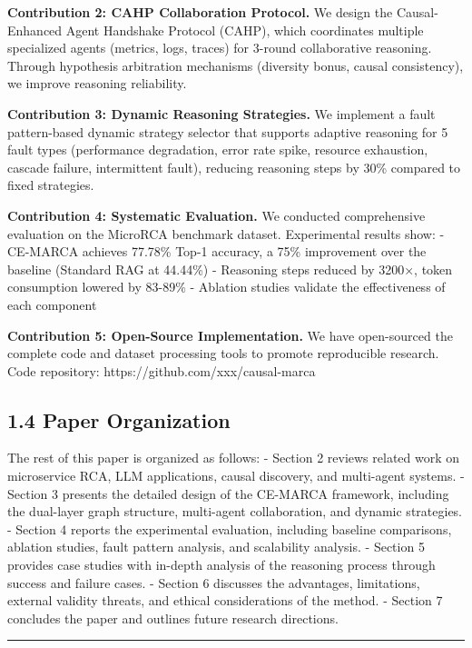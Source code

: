 \textbf{Contribution 2: CAHP Collaboration Protocol.} We design the
Causal-Enhanced Agent Handshake Protocol (CAHP), which coordinates
multiple specialized agents (metrics, logs, traces) for 3-round
collaborative reasoning. Through hypothesis arbitration mechanisms
(diversity bonus, causal consistency), we improve reasoning reliability.

\textbf{Contribution 3: Dynamic Reasoning Strategies.} We implement a
fault pattern-based dynamic strategy selector that supports adaptive
reasoning for 5 fault types (performance degradation, error rate spike,
resource exhaustion, cascade failure, intermittent fault), reducing
reasoning steps by 30\% compared to fixed strategies.

\textbf{Contribution 4: Systematic Evaluation.} We conducted
comprehensive evaluation on the MicroRCA benchmark dataset. Experimental
results show: - CE-MARCA achieves 77.78\% Top-1 accuracy, a 75\%
improvement over the baseline (Standard RAG at 44.44\%) - Reasoning
steps reduced by 3200×, token consumption lowered by 83-89\% - Ablation
studies validate the effectiveness of each component

\textbf{Contribution 5: Open-Source Implementation.} We have
open-sourced the complete code and dataset processing tools to promote
reproducible research. Code repository:
https://github.com/xxx/causal-marca

\hypertarget{paper-organization}{%
\subsection{1.4 Paper Organization}\label{paper-organization}}

The rest of this paper is organized as follows: - Section 2 reviews
related work on microservice RCA, LLM applications, causal discovery,
and multi-agent systems. - Section 3 presents the detailed design of the
CE-MARCA framework, including the dual-layer graph structure,
multi-agent collaboration, and dynamic strategies. - Section 4 reports
the experimental evaluation, including baseline comparisons, ablation
studies, fault pattern analysis, and scalability analysis. - Section 5
provides case studies with in-depth analysis of the reasoning process
through success and failure cases. - Section 6 discusses the advantages,
limitations, external validity threats, and ethical considerations of
the method. - Section 7 concludes the paper and outlines future research
directions.

\begin{center}\rule{0.5\linewidth}{0.5pt}\end{center}

